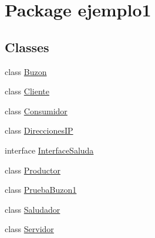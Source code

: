 \hypertarget{namespaceejemplo1}{}\section{Package ejemplo1}
\label{namespaceejemplo1}
\subsection*{Classes}
\begin{DoxyCompactItemize}
\item 
class \mbox{\hyperlink{classejemplo1_1_1_buzon}{Buzon}}
\item 
class \mbox{\hyperlink{classejemplo1_1_1_cliente}{Cliente}}
\item 
class \mbox{\hyperlink{classejemplo1_1_1_consumidor}{Consumidor}}
\item 
class \mbox{\hyperlink{classejemplo1_1_1_direcciones_i_p}{Direcciones\+IP}}
\item 
interface \mbox{\hyperlink{interfaceejemplo1_1_1_interface_saluda}{Interface\+Saluda}}
\item 
class \mbox{\hyperlink{classejemplo1_1_1_productor}{Productor}}
\item 
class \mbox{\hyperlink{classejemplo1_1_1_prueba_buzon1}{Prueba\+Buzon1}}
\item 
class \mbox{\hyperlink{classejemplo1_1_1_saludador}{Saludador}}
\item 
class \mbox{\hyperlink{classejemplo1_1_1_servidor}{Servidor}}
\end{DoxyCompactItemize}
